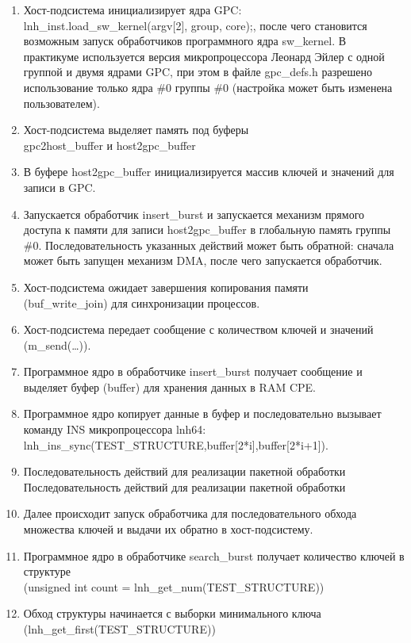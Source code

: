 \begin{enumerate}
	\item Хост-подсистема инициализирует ядра GPC: \\lnh\_inst.load\_sw\_kernel(argv[2], group, core);, после чего становится возможным запуск обработчиков программного ядра sw\_kernel. В практикуме используется версия микропроцессора Леонард Эйлер с одной группой и двумя ядрами GPC, при этом в файле gpc\_defs.h разрешено использование только ядра \#0 группы \#0 (настройка может быть изменена пользователем).
	\item Хост-подсистема выделяет память под буферы \\gpc2host\_buffer и host2gpc\_buffer
	\item В буфере host2gpc\_buffer инициализируется массив ключей и значений для записи в GPC.
	\item Запускается обработчик insert\_burst и запускается механизм прямого доступа к памяти для записи host2gpc\_buffer в глобальную память группы \#0. Последовательность указанных действий может быть обратной: сначала может быть запущен механизм DMA, после чего запускается обработчик.
	\item Хост-подсистема ожидает завершения копирования памяти \\(buf\_write\_join) для синхронизации процессов.
	\item Хост-подсистема передает сообщение с количеством ключей и значений (m\_send(…)).
	\item Программное ядро в обработчике insert\_burst получает сообщение и выделяет буфер (buffer) для хранения данных в RAM CPE.
	\item Программное ядро копирует данные в буфер и последовательно вызывает команду INS микропроцессора lnh64: \\lnh\_ins\_sync(TEST\_STRUCTURE,buffer[2*i],buffer[2*i+1]).
	\item Последовательность действий для реализации пакетной обработки Последовательность действий для реализации пакетной обработки
	\item Далее происходит запуск обработчика для последовательного обхода множества ключей и выдачи их обратно в хост-подсистему.
	\item Программное ядро в обработчике search\_burst получает количество ключей в структуре \\(unsigned int count = lnh\_get\_num(TEST\_STRUCTURE))
	\item Обход структуры начинается с выборки минимального ключа \\(lnh\_get\_first(TEST\_STRUCTURE))

\end{enumerate}
